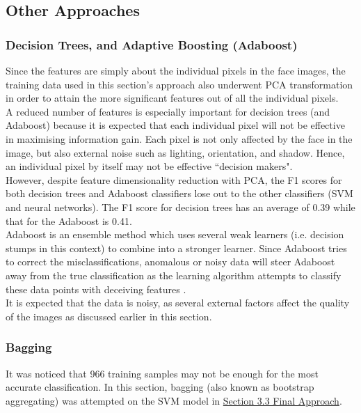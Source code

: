 \documentclass{article}
\begin{document}
\subsection{Other Approaches}
\subsubsection{Decision Trees, and Adaptive Boosting (Adaboost)}
Since the features are simply about the individual pixels in the face images, the training data used in this section's approach also underwent PCA transformation in order to attain the more significant features out of all the individual pixels. \\

A reduced number of features is especially important for decision trees (and Adaboost) because it is expected that each individual pixel will not be effective in maximising information gain. Each pixel is not only affected by the face in the image, but also external noise such as lighting, orientation, and shadow. Hence, an individual pixel by itself may not be effective ``decision makers". \\

However, despite feature dimensionality reduction with PCA, the F1 scores for both decision trees and Adaboost classifiers lose out to the other classifiers (SVM and neural networks). The F1 score for decision trees has an average of 0.39 while that for the Adaboost is 0.41. \\

Adaboost is an ensemble method which uses several weak learners (i.e. decision stumps in this context) to combine into a stronger learner. Since Adaboost tries to correct the misclassifications, anomalous or noisy data will steer Adaboost away from the true classification as the learning algorithm attempts to classify these data points with deceiving features \cite{bib-02}. \\

It is expected that the data is noisy, as several external factors affect the quality of the images as discussed earlier in this section.

\subsubsection{Bagging}
It was noticed that 966 training samples may not be enough for the most accurate classification. In this section, bagging (also known as bootstrap aggregating) was attempted on the SVM model in \hyperref[sec:3.3]{Section 3.3 Final Approach}. \\
\end{document}

